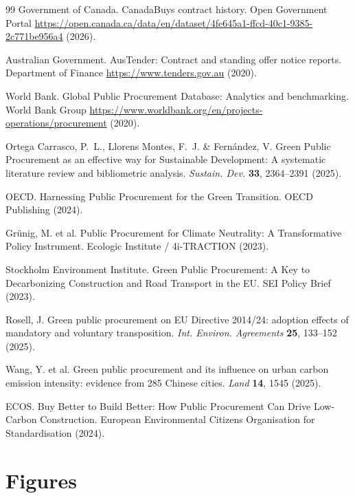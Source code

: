 \documentclass[11pt,a4paper]{article}
\begin{document}
\begin{thebibliography}{99}
Government of Canada. CanadaBuys contract history. Open Government Portal \url{https://open.canada.ca/data/en/dataset/4fe645a1-ffcd-40c1-9385-2c771be956a4} (2026).

Australian Government. AusTender: Contract and standing offer notice reports. Department of Finance \url{https://www.tenders.gov.au} (2020).

World Bank. Global Public Procurement Database: Analytics and benchmarking. World Bank Group \url{https://www.worldbank.org/en/projects-operations/procurement} (2020).

Ortega Carrasco, P.~L., Llorens Montes, F.~J. \& Fern\'{a}ndez, V. Green Public Procurement as an effective way for Sustainable Development: A systematic literature review and bibliometric analysis. \textit{Sustain. Dev.} \textbf{33}, 2364--2391 (2025).

OECD. Harnessing Public Procurement for the Green Transition. OECD Publishing (2024).

Gr\"{u}nig, M. et al. Public Procurement for Climate Neutrality: A Transformative Policy Instrument. Ecologic Institute / 4i-TRACTION (2023).

Stockholm Environment Institute. Green Public Procurement: A Key to Decarbonizing Construction and Road Transport in the EU. SEI Policy Brief (2023).

Rosell, J. Green public procurement on EU Directive 2014/24: adoption effects of mandatory and voluntary transposition. \textit{Int. Environ. Agreements} \textbf{25}, 133--152 (2025).

Wang, Y. et al. Green public procurement and its influence on urban carbon emission intensity: evidence from 285 Chinese cities. \textit{Land} \textbf{14}, 1545 (2025).

ECOS. Buy Better to Build Better: How Public Procurement Can Drive Low-Carbon Construction. European Environmental Citizens Organisation for Standardisation (2024).

\end{thebibliography}

\clearpage
\section*{Figures}
\end{document}
